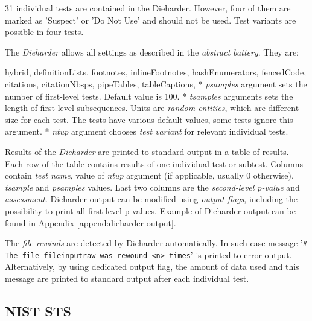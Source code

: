 \documentclass[
  digital,     %
  oneside,     %
  nosansbold,  %
  nocolorbold, %
  nolof,         %
  nolot,         %
]{fithesis4}
\begin{document}
31 individual tests are contained in the Dieharder. However, four of them are marked as 'Suspect' or 'Do Not Use' and should not be used. Test variants are possible in four tests.

The \emph{Dieharder} allows all settings as described in the \emph{abstract battery}. They are:
\begin{markdown*}{%
  hybrid,
  definitionLists,
  footnotes,
  inlineFootnotes,
  hashEnumerators,
  fencedCode,
  citations,
  citationNbsps,
  pipeTables,
  tableCaptions,
}
* \emph{psamples} argument sets the number of first-level tests. Default value is 100.
* \emph{tsamples} arguments sets the length of first-level subsequences. Units are \emph{random entities}, which are different size for each test. The tests have various default values, some tests ignore this argument.
* \emph{ntup} argument chooses \emph{test variant} for relevant individual tests.

\end{markdown*}

Results of the \emph{Dieharder} are printed to standard output in a table of results. Each row of the table contains results of one individual test or subtest. Columns contain \emph{test name}, value of \emph{ntup} argument (if applicable, usually 0 otherwise), \emph{tsample} and \emph{psamples} values. Last two columns are the \emph{second-level p-value} and \emph{assessment}. Dieharder output can be modified using \emph{output flags}, including the possibility to print all first-level p-values. Example of Dieharder output can be found in Appendix \ref{append:dieharder-output}.

The \emph{file rewinds} are detected by Dieharder automatically. In such case message '\texttt{\# The file file\textunderscore input\textunderscore raw was rewound <n> times}' is printed to error output. Alternatively, by using dedicated output flag, the amount of data used and this message are printed to standard output after each individual test.

\subsection{NIST STS} \label{chap:sols-nist}
\end{document}
